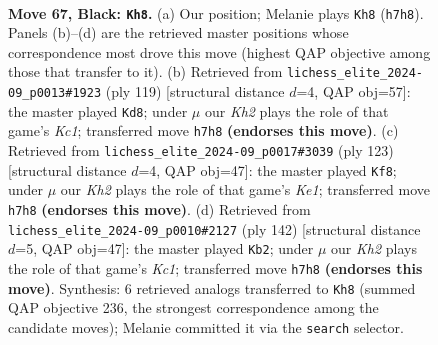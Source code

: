 \documentclass[11pt]{article}
\begin{document}
\clearpage

\begin{figure}[p]\centering
\begin{subfigure}{0.46\textwidth}\centering
\resizebox{\linewidth}{!}{%
\newchessgame
\chessboard[
  setfen={8/R6k/8/8/5K2/1r6/7P/3r4 b - - 2 67},
  showmover=false,
  pgfstyle=straightmove, color=movearrow, markmove={h7-h8}
]}
\caption{}
\end{subfigure}\hfill
\begin{subfigure}{0.46\textwidth}\centering
\resizebox{\linewidth}{!}{%
\newchessgame
\chessboard[
  setfen={2k5/6r1/1K1P4/8/8/8/2R5/8 b - - 10 60},
  showmover=false,
  pgfstyle=straightmove, color=movearrow, markmove={c8-d8}
]}
\caption{}
\end{subfigure}
\\[4pt]
\begin{subfigure}{0.46\textwidth}\centering
\resizebox{\linewidth}{!}{%
\newchessgame
\chessboard[
  setfen={4k3/r7/5P2/8/7K/4R3/8/8 b - - 12 62},
  showmover=false,
  pgfstyle=straightmove, color=movearrow, markmove={e8-f8}
]}
\caption{}
\end{subfigure}\hfill
\begin{subfigure}{0.46\textwidth}\centering
\resizebox{\linewidth}{!}{%
\newchessgame
\chessboard[
  setfen={8/5R2/6R1/8/3k2p1/8/8/2K4r w - - 4 72},
  showmover=false,
  pgfstyle=straightmove, color=movearrow, markmove={c1-b2}
]}
\caption{}
\end{subfigure}
\caption{\textbf{Move 67, Black: \texttt{Kh8}.} (a) Our position; Melanie plays \texttt{Kh8} (\texttt{h7h8}). Panels (b)--(d) are the retrieved master positions whose correspondence most drove this move (highest QAP objective among those that transfer to it). (b) Retrieved from \texttt{lichess\_elite\_2024-09\_p0013\#1923} (ply 119) [structural distance $d$=4, QAP obj=57]: the master played \texttt{Kd8}; under $\mu$ our \emph{Kh2} plays the role of that game's \emph{Kc1}; transferred move \texttt{h7h8} \textbf{(endorses this move)}. (c) Retrieved from \texttt{lichess\_elite\_2024-09\_p0017\#3039} (ply 123) [structural distance $d$=4, QAP obj=47]: the master played \texttt{Kf8}; under $\mu$ our \emph{Kh2} plays the role of that game's \emph{Ke1}; transferred move \texttt{h7h8} \textbf{(endorses this move)}. (d) Retrieved from \texttt{lichess\_elite\_2024-09\_p0010\#2127} (ply 142) [structural distance $d$=5, QAP obj=47]: the master played \texttt{Kb2}; under $\mu$ our \emph{Kh2} plays the role of that game's \emph{Kc1}; transferred move \texttt{h7h8} \textbf{(endorses this move)}. Synthesis: 6 retrieved analogs transferred to \texttt{Kh8} (summed QAP objective 236, the strongest correspondence among the candidate moves); Melanie committed it via the \texttt{search} selector.}
\label{fig:thought-m133}
\end{figure}
\end{document}
